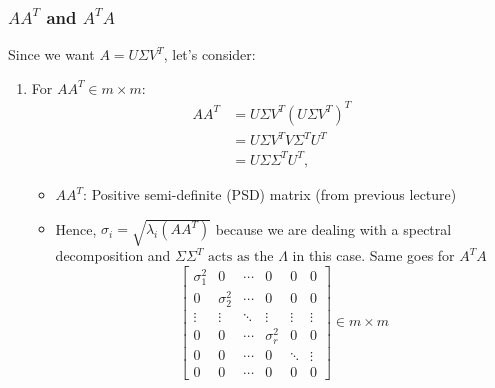 \subsubsection{$AA^T$ and $A^T A$}
\begin{derivation}
    Since we want \( A = U \Sigma V^T \), let's consider:

    \begin{enumerate}
        \item For \( A A^T \in m \times m\):
        \begin{align*}
            A A^T &= U \Sigma V^T (U \Sigma V^T)^T \\
            &= U \Sigma V^T V \Sigma^T U^T \\
            &= U \Sigma \Sigma^T U^T,
        \end{align*}
        \begin{itemize}
            \item \( A A^T \): Positive semi-definite (PSD) matrix (from previous lecture)
            \item Hence, \( \sigma_i = \sqrt{\lambda_i(A A^T)} \) because we are dealing with a spectral decomposition and $\Sigma \Sigma^T \text{ acts as the } \Lambda$ in this case. Same goes for $A^TA$
            \[
            \begin{bmatrix}
            \sigma_1^2 & 0         & \cdots & 0       & 0       & 0       \\
            0          & \sigma_2^2 & \cdots & 0       & 0       & 0       \\
            \vdots     & \vdots    & \ddots & \vdots  & \vdots  & \vdots  \\
            0          & 0         & \cdots & \sigma_r^2 & 0       & 0       \\
            0          & 0         & \cdots & 0       & \ddots  & \vdots  \\
            0          & 0         & \cdots & 0       & 0       & 0
            \end{bmatrix} \in m \times m
            \]

        \end{itemize}
    

\end{enumerate}
\end{derivation}
